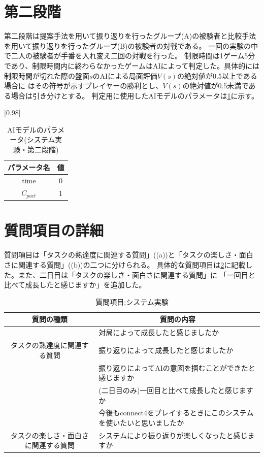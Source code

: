 \section{第二段階}
第二段階は提案手法を用いて振り返りを行ったグループ(A)の被験者と比較手法を用いて振り返りを行ったグループ(B)の被験者の対戦である。
一回の実験の中で二人の被験者が手番を入れ変え二回の対戦を行った。
制限時間は1ゲーム5分であり、制限時間内に終わらなかったゲームはAIによって判定した。具体的には制限時間が切れた際の盤面$s$のAIによる局面評価$V(s)$の絶対値が0.5以上である場合に
はその符号が示すプレイヤーの勝利とし、$V(s)$の絶対値が0.5未満である場合は引き分けとする。
判定用に使用したAIモデルのパラメータは\ref{table:param-judge}に示す。
\begin{table}[H]
	\caption{AIモデルのパラメータ(システム実験・第二段階)}
	\centering
	\scalebox{0.98}[0.98]{
		\begin{tabular}{c|c}
			パラメータ名 & 値 \\ \hline
			time    & 0\\ 
			$C_{puct}$    & 1 \\
		\end{tabular}
	}
	\label{table:param-judge}
\end{table}


\section{質問項目の詳細}
質問項目は「タスクの熟達度に関連する質問」((a))と「タスクの楽しさ・面白さに関連する質問」((b))の二つに分けられる。
具体的な質問項目は\ref{table:query}に記載した。また、二日目は「タスクの楽しさ・面白さに関連する質問」に
「一回目と比べて成長したと感じますか」を追加した。
\begin{table}[H]
    \caption{質問項目:システム実験}
	\scriptsize
    \begin{tabular}{c||l}
        \multicolumn{1}{c|}{質問の種類} & \multicolumn{1}{c}{質問の内容} \\ \hline \hline
        \multicolumn{1}{c||}{}&対局によって成長したと感じましたか \\
        タスクの熟達度に関連する質問 & 振り返りによって成長したと感じましたか \\
		\multicolumn{1}{c||}{}&振り返りによってAIの意図を掴むことができたと感じますか \\
		\multicolumn{1}{c||}{} & (二日目のみ)一回目と比べて成長したと感じますか\\\hline
        \multicolumn{1}{c||}{} & 今後もconnect4をプレイするときにこのシステムを使いたいと思いましたか \\
        タスクの楽しさ・面白さに関連する質問 & システムにより振り返りが楽しくなったと感じますか\\
    \end{tabular}
    \label{table:query}
\end{table}
